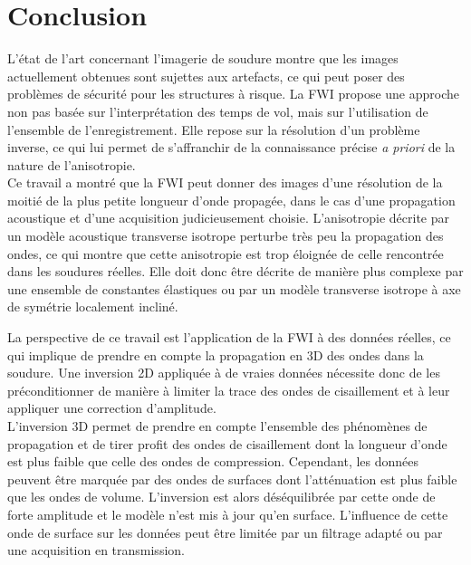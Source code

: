 \chapter*{Conclusion}

L'état de l'art concernant l'imagerie de soudure montre que les images actuellement obtenues sont sujettes aux artefacts, ce qui peut poser des problèmes de sécurité pour les structures à risque. La FWI propose une approche non pas basée sur l'interprétation des temps de vol, mais sur l'utilisation de l'ensemble de l'enregistrement. Elle repose sur la résolution d'un problème inverse, ce qui lui permet de s'affranchir de la connaissance précise \emph{a priori} de la nature de l'anisotropie.\\

Ce travail a montré que la FWI peut donner des images d'une résolution de la moitié de la plus petite longueur d'onde propagée, dans le cas d'une propagation acoustique et d'une acquisition judicieusement choisie. L'anisotropie  décrite par un modèle acoustique transverse isotrope perturbe très peu la propagation des ondes, ce qui montre que cette anisotropie est trop éloignée de celle rencontrée dans les soudures réelles. Elle doit donc être décrite de manière plus complexe par une ensemble de constantes élastiques ou par un modèle transverse isotrope à axe de symétrie localement incliné.





La perspective de ce travail est l'application de la FWI à des données réelles, ce qui implique de prendre en compte la propagation en 3D des ondes dans la soudure. Une inversion 2D appliquée à de vraies données nécessite donc de les préconditionner de manière à limiter la trace des ondes de cisaillement et à leur appliquer une correction d'amplitude. \\

L'inversion 3D permet de prendre en compte l'ensemble des phénomènes de propagation et de tirer profit des ondes de cisaillement dont la longueur d'onde est plus faible que celle des ondes de compression. Cependant, les données peuvent être marquée par des ondes de surfaces dont l'atténuation est plus faible que les ondes de volume.  L'inversion est alors déséquilibrée par cette onde de forte amplitude et le modèle n'est mis à jour qu'en surface. L'influence de cette onde de surface sur les données peut être limitée par un filtrage adapté ou par une acquisition en transmission.\\ 


